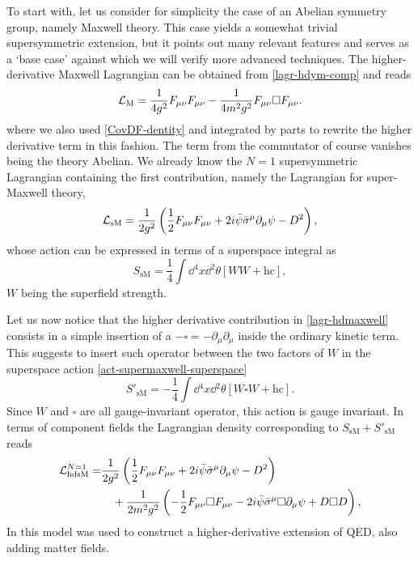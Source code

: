 To start with, let us consider for simplicity the case of an Abelian symmetry group, namely Maxwell theory. This case yields a somewhat trivial supersymmetric extension, but it points out many relevant features and serves as a `base case' against which we will verify more advanced techniques.
The higher-derivative Maxwell Lagrangian can be obtained from \eqref{lagr-hdym-comp}  and reads
\begin{equation}\label{lagr-hdmaxwell}
{ \mathcal{L} }_{\text{M}} = 
\frac{1}{4 g^2} F_{\mu\nu} F_{\mu\nu} 
- \frac{1}{4 m^2 g^2}  F_{\mu\nu}  \square  F_{\mu\nu}.
\end{equation}
where we also used \eqref{CovDF-dentity} and integrated by parts to rewrite the higher derivative term in this fashion. The term from the commutator of course vanishes being the theory Abelian.
We already know the $N=1$ supersymmetric Lagrangian containing the first contribution, namely the Lagrangian for super-Maxwell theory,
\begin{equation}
{ \mathcal{L} }_{\text{sM}} = 
\frac{1}{2 g^2} \left( \frac{1}{2} F_{\mu\nu} F_{\mu\nu} 
+2 i \bar \psi \bar \sigma^\mu \partial_\mu \psi - D^2  \right),
\end{equation}
whose action can be expressed in terms of a superspace integral as
\begin{equation}\label{act-supermaxwell-superspace}
S_{\text{sM}} = 
\frac{1}{4}
\int \dd{^4x} \dd{^2 \theta}\left[ W W + \text{hc}%
\right],
\end{equation}
$W$ being the superfield strength.

Let us now notice that the higher derivative contribution in \eqref{lagr-hdmaxwell} consists in a simple insertion of a $ - \square = - \partial_\mu \partial_\mu$ inside the ordinary kinetic term. This suggests to insert such operator between the two factors of $W$ in the superspace action \eqref{act-supermaxwell-superspace}
\begin{equation}
S'_{\text{sM}} = 
- \frac{1}{4}
\int \dd{^4x} \dd{^2 \theta}\left[ W \square W +  \text{hc} %
\right].
\end{equation}
Since $W$ and $\square$ are all gauge-invariant operator, this action is gauge invariant.
In terms of component fields the Lagrangian density corresponding to $S_{\text{sM}} + S'_{\text{sM}} $ reads
\begin{equation}\label{lagr-N=1-supermax}
\begin{split}
{ \mathcal{L} }^{N=1}_{{ \text{hd} }\text{sM}}
=
&
\frac{1}{2 g^2} \left( \frac{1}{2} F_{\mu\nu} F_{\mu\nu} 
+2 i \bar \psi \bar \sigma^\mu \partial_\mu \psi - D^2  \right)
\\
&\quad + \frac{1}{2 m^2 g^2} \left(- \frac{1}{2} F_{\mu\nu} \square F_{\mu\nu} 
- 2 i \bar \psi \bar \sigma^\mu \square \partial_\mu \psi +  D\square D
\right),
\end{split}
\end{equation}
In \cite{Gama:2011ws}  this model was used to construct a higher-derivative extension of QED, also adding matter fields.

